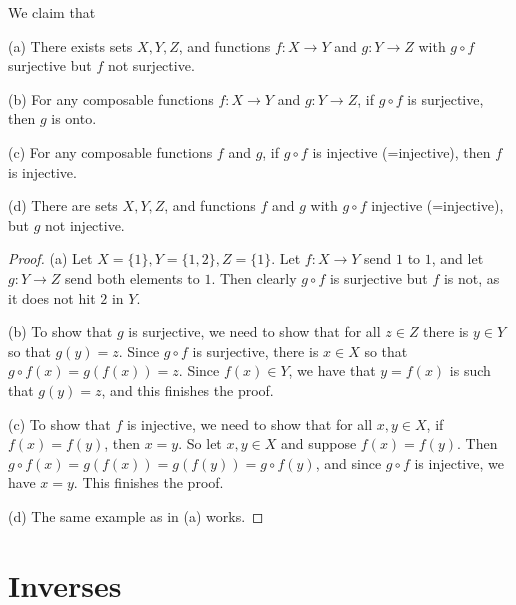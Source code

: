 \documentclass[a4paper,12pt,dvipsnames]{book}
\numberwithin{theorem}{chapter}
\theoremstyle{remark}
\begin{document}
\begin{solution}
We claim that

(a) There exists sets $X, Y, Z$, and functions $f:X\to Y$ and $g:Y\to Z$ with $g\circ f$ surjective but $f$ not surjective.

(b) For any composable functions $f:X\to Y$ and $g:Y\to Z$, if $g\circ f$ is surjective, then $g$ is onto.

(c) For any composable functions $f$ and $g$, if $g\circ f$ is injective (=injective), then $f$ is injective.

(d) There are sets $X, Y, Z$, and functions $f$ and $g$ with $g\circ f$ injective (=injective), but $g$ not injective.


\begin{proof}
(a) Let $X=\{1\}, Y=\{1,2\}, Z=\{1\}$.  Let $f:X\to Y$ send $1$ to $1$, and let $g:Y\to Z$ send both elements to $1$.  Then clearly $g\circ f$ is surjective but $f$ is not, as it does not hit $2$ in $Y$.

(b) To show that $g$ is surjective, we need to show that for all $z\in Z$ there is $y\in Y$ so that $g(y)=z$. Since $g\circ f$ is surjective, there is $x\in X$ so that $g\circ f(x)=g(f(x))=z$. Since $f(x)\in Y$, we have that $y=f(x)$ is such that $g(y)=z$, and this finishes the proof. 



(c) To show that $f$ is injective, we need to show that for all $x,y\in X$, if $f(x)=f(y)$, then $x=y$. So let $x,y\in X$ and suppose $f(x)=f(y)$. Then $g\circ f(x)=g(f(x))=g(f(y))=g\circ f(y)$, and since $g\circ f$ is injective, we have $x=y$. This finishes the proof. 

(d) The same example as in (a) works.


\end{proof}


\end{solution}





\section{Inverses}
\end{document}
